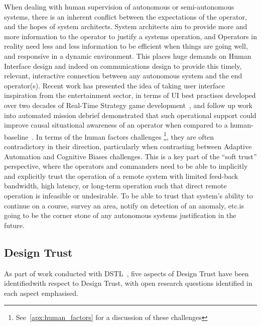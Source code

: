 When dealing with human supervision of autonomous or semi-autonomous systems, there is an inherent conflict between the expectations of the operator, and the hopes of system architects.
System architects aim to provide more and more information to the operator to justify a systems operation, and Operators in reality need less and less information to be efficient when things are going well, and responsive in a dynamic environment.
This places huge demands on Human Interface design and indeed on communications design to provide this timely, relevant, interactive connection between any autonomous system and the end operator(s).
Recent work has presented the idea of taking user interface inspiration from the entertainment sector, in terms of UI best practises developed over two decades of Real-Time Strategy game development~\cite{Johnson2007}, and follow up work into automated mission debrief demonstrated that such operational support could improve causal situational awareness of an operator when compared to a human-baseline~\cite{Johnson2011}.
In terms of the human factors challenges \footnote{See~\autoref{apx:human_factors} for a discussion of these challenges}, they are often contradictory in their direction, particularly when contrasting between Adaptive Automation and Cognitive Biases challenges.
This is a key part of the ``soft trust'' perspective, where the operators and commanders need to be able to implicitly and explicitly trust the operation of a remote system with limited feed-back bandwidth, high latency, or long-term operation such that direct remote operation is infeasible or undesirable.
To be able to trust that system's ability to continue on a course, survey an area, notify on detection of an anomaly, etc.is going to be the corner stone of any autonomous systems justification in the future.

\subsection{Design Trust}\label{sec:design_trust}

As part of work conducted with DSTL~\cite{Bolster2014a}, five aspects of Design Trust have been identifiedwith respect to Design Trust, with open research questions identified in each aspect emphasised.

